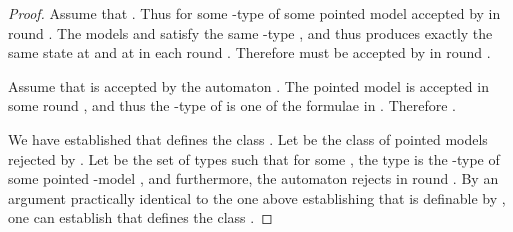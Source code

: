 \documentclass[copyright,creativecommons]{eptcs}
\newtheorem{lemma}[theorem]{Lemma}
\begin{document}
\begin{proof}
Assume that . Thus
 for some -type  of some pointed model 
accepted by  in round .
The models  and  satisfy the same -type ,
and thus  produces exactly the same
state at  and at  in each round .
Therefore  must be accepted by  in round .




Assume that  is accepted by the automaton .
The pointed model  is accepted in some round ,
and thus the -type of  is one of the formulae in .
Therefore .




We have established that  defines the class .
Let  be the class of pointed models
rejected by .
Let  be the set of types  such
that for some , the type  is the -type of 
some pointed -model , and furthermore, the automaton 
rejects  in round . 
By an argument practically identical to the one above establishing that 
is definable by , one can establish that 
defines the class .
\begin{comment}
If  defines a local algorithm in some class ,
then there exists some  such that each pointed model in  is either accepted or
rejected in some round . Let  be the class of
pointed models accepted by  in .
Define  to the set of exactly all types  such that  is the -type
of some  accepted in round . The set  is finite.
An argument practically identical to the argument
discussed above shows that
 defines  with respect to . 
Since  is finite,  is a formula of .
\end{comment}
\end{proof}




\begin{comment}
\begin{lemma}\label{formulatoalgorithm}
Let  and  be finite sets of unary
and binary relation symbols.
Let  be any class of pointed -models.
Let  be a formula of  that defines a class 
of pointed models with respect to .
Then there is a -automaton  that accepts  in .
Furthermore,  specifies a local algorithm in .
\end{lemma}
\begin{proof}
As discussed in the beginning of the current section, each -formula  is equivalent to
the disjunction of -types  such that .
Let  be the set of -types  such that .
Thus the type automaton  whose set of accepting states is , accepts  in .
Now notice that type automata have the property that no state can be visited twice.
Hence, since  is a finite set of states of , and since  is a type automaton,
we can transform  into an automaton  that specifies a local algorithm in 
and accepts  in .
\end{proof}
\end{comment}
\end{document}

